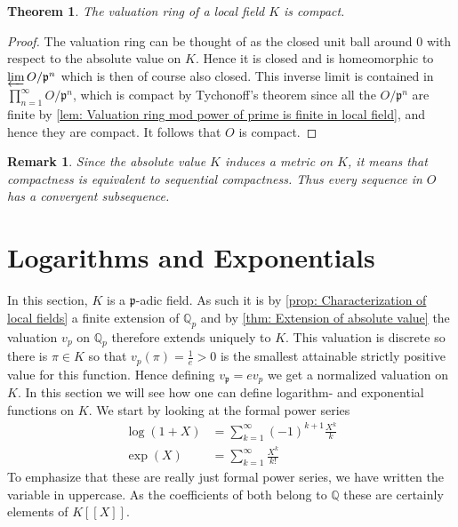 \documentclass{article}
\newtheorem{theorem}{Theorem}[section]
\newtheorem{remark}{Remark}[section]
\newcommand{\mfrak}[1]{\mathfrak{#1}}
\newcommand{\mbb}[1]{\mathbb{#1}}
\newcommand{\vp}{{v_{\mfrak p}}}
\begin{document}
\begin{theorem} \label{thm: Valuation ring in local field is compact}
    The valuation ring of a local field $K$ is compact.
\end{theorem}
\begin{proof}
    The valuation ring can be thought of as the closed unit ball around 0 with respect to the absolute value on $K$. Hence it is closed and is homeomorphic to $\varprojlim O / \mfrak p^n$ which is then of course also closed. This inverse limit is contained in $\prod_{n = 1}^\infty O / \mfrak p^n$, which is compact by Tychonoff's theorem since all the $O / \mfrak p^n$ are finite by \cref{lem: Valuation ring mod power of prime is finite in local field}, and hence they are compact. It follows that $O$ is compact.
\end{proof}
\begin{remark}\label{rem: Compactness is equivalent to sequential compactness}
    Since the absolute value $K$ induces a metric on $K$, it means that compactness is equivalent to sequential compactness. Thus every sequence in $O$ has a convergent subsequence.
\end{remark}



\section{Logarithms and Exponentials}
In this section, $K$ is a $\mfrak p$-adic field. As such it is by \cref{prop: Characterization of local fields} a finite extension of $\mbb Q_p$ and by \cref{thm: Extension of absolute value} the valuation $v_p$ on $\mbb Q_p$ therefore extends uniquely to $K$. This valuation is discrete so there is $\pi \in K$ so that $v_p(\pi) = \frac{1}{e} > 0$ is the smallest attainable strictly positive value for this function. Hence defining $\vp = e v_p$ we get a normalized valuation on $K$. In this section we will see how one can define logarithm- and exponential functions on $K$. We start by looking at the formal power series 
\begin{align}
    \log(1+X) &= \sum_{k = 1}^\infty (-1)^{k+1}\frac{X^k}{k} \label{logarithm series} \\
    \exp(X) &= \sum_{k = 1}^\infty \frac{X^k}{k!} \label{exponential series} 
\end{align}
To emphasize that these are really just formal power series, we have written the variable in uppercase. As the coefficients of both belong to $\mbb Q$ these are certainly elements of $K[[X]]$.
\end{document}

